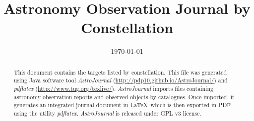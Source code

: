 \documentclass[10pt,twoside,a4paper,english]{article}
\title{Astronomy Observation Journal by Constellation}
\author{}
\date{\today}
\begin{document}
\maketitle
\thispagestyle{empty}

\begin{abstract}
This document contains the targets listed by constellation. This file was generated using Java software tool {\it AstroJournal} (\href{http://pdp10.github.io/AstroJournal/}{http://pdp10.github.io/AstroJournal/}) and {\it pdflatex} (\href{http://www.tug.org/texlive/}{http://www.tug.org/texlive/}). {\it AstroJournal} imports files containing astronomy observation reports and observed objects by catalogues. Once imported, it generates an integrated journal document in \LaTeX\ which is then exported in PDF using the utility {\it pdflatex}. {\it AstroJournal} is released under GPL v3 license.
\end{abstract}


\tableofcontents

\clearpage
{}


\small
%
\clearpage


\small
\end{document}
